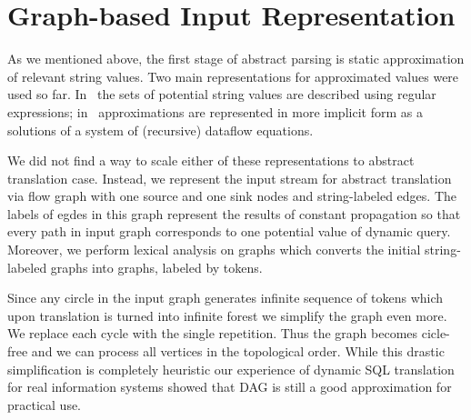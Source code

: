 \section{Graph-based Input Representation}

As we mentioned above, the first stage of abstract parsing is static approximation
of relevant string values. Two main representations for approximated values were
used so far. In~\cite{StringExpr,ALVOR1,ALVOR2} the sets of potential string values 
are described using regular expressions; in~\cite{AbstrParsing} approximations are
represented in more implicit form as a solutions of a system of (recursive) dataflow 
equations. 

We did not find a way to scale either of these representations to abstract translation case. 
Instead, we represent the input stream for abstract translation via flow graph with one source and
one sink nodes and string-labeled edges. The labels of egdes in this graph represent the results 
of constant propagation so that every path in input graph corresponds to one potential value of dynamic query. 
Moreover, we perform lexical analysis on graphs which converts the initial string-labeled graphs into
graphs, labeled by tokens.


Since any circle in the input graph generates infinite sequence of tokens which upon translation is turned 
into infinite forest we simplify the graph even more. We replace each cycle with the single repetition. 
Thus the graph becomes cicle-free and we can process all vertices in the topological order.
While this drastic simplification is completely heuristic our experience of dynamic SQL translation 
for real information systems showed that DAG is still a good approximation for practical use.

